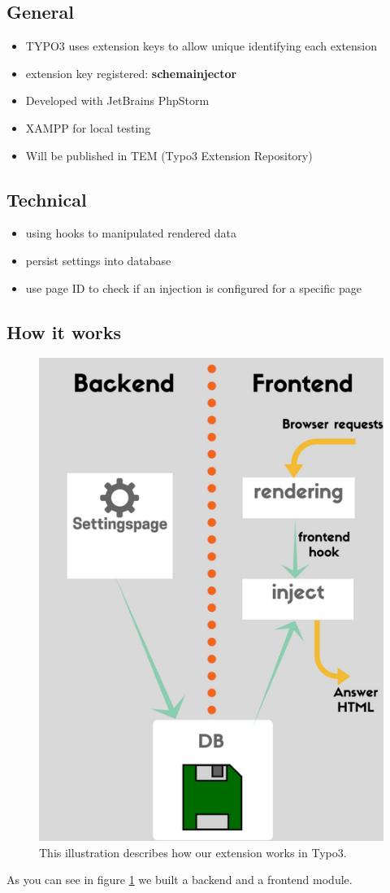 \documentclass{article}
\begin{document}
\subsection{General}
\begin{itemize}
	\item TYPO3 uses extension keys to allow unique identifying each extension
	\item extension key registered:  \textbf{schema\textunderscore injector}
	\item Developed with JetBrains PhpStorm
	\item XAMPP for local testing
	\item Will be published in TEM (Typo3 Extension Repository)
\end{itemize}
	
\subsection{Technical}
\begin{itemize}
	\item using hooks to manipulated rendered data
	\item persist settings into database
	\item use page ID to check if an injection is configured for a specific page
\end{itemize}


\subsection{How it works}
\begin{figure}[ht]
	\centering
	\includegraphics[height=0.75\textwidth]{work_flow.png}
	\caption{This illustration describes how our extension works in Typo3.}
	\label{work_flow}
\end{figure}
As you can see in figure \ref{work_flow} we built a backend and a frontend module.
\end{document}
